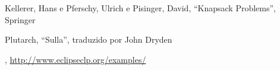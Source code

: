 \begin{thebibliography}{2}

 Kellerer, Hans e Pferschy, Ulrich e Pisinger,
  David, ``Knapsack Problems'', Springer

 Plutarch, ``Sulla'', traduzido por John Dryden

 \eclipse,
  \url{http://www.eclipseclp.org/examples/}

\end{thebibliography}

%
